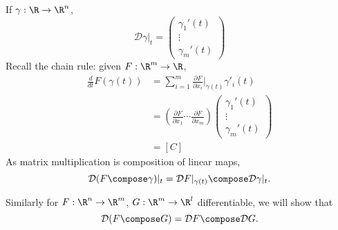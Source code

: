\documentclass[a4paper]{article}
\newcommand*{\D}{\mathcal{D}}
\theoremstyle{definition}
\begin{document}
\begin{eg}
  If \(\gamma: \R \to \R^n\),
  \[
    \D \gamma|_t =
    \begin{pmatrix}
      \gamma_1'(t) \\
      \vdots \\
      \gamma_m'(t)
    \end{pmatrix}
  \]
  Recall the chain rule: given \(F: \R^m \to \R\),
  \begin{align*}
    \frac{d}{dt} F(\gamma(t)) &= \sum_{i = 1}^{m} \frac{\partial F}{\partial x_i} \Big|_{\gamma(t)} \gamma'_i(t) \\
                              &=
                                  \left( \frac{\partial F}{\partial x_1}  \cdots \frac{\partial F}{\partial x_m} \right)
                                \begin{pmatrix}
                                  \gamma_1'(t) \\
                                  \vdots \\
                                  \gamma_m'(t)
                                \end{pmatrix} \\
                              &= [C]
  \end{align*}
  As matrix multiplication is composition of linear maps,
  \[
    \D( F \compose \gamma)|_t = \D F|_{\gamma(t)} \compose \D \gamma|_t.
  \]
\end{eg}

Similarly for \(F: \R^n \to \R^m\), \(G: \R^m \to \R^l\) differentiable, we will show that
\[
    \D( F \compose G) = \D F \compose \D G.
\]
\end{document}
